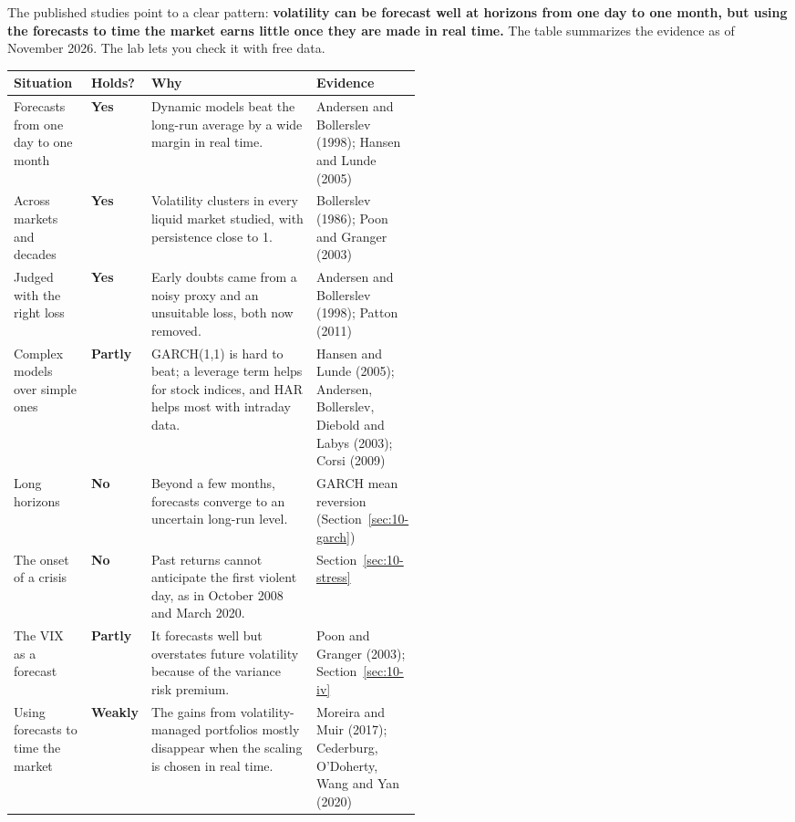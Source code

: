 The published studies point to a clear pattern: \textbf{volatility can be forecast well at horizons from one day to one month, but using the forecasts to time the market earns little once they are made in real time.} The table summarizes the evidence as of November 2026. The lab lets you check it with free data.

\begin{center}
\small
\begin{tabularx}{\linewidth}{@{}>{\raggedright\arraybackslash}p{0.19\linewidth}>{\raggedright\arraybackslash}p{0.10\linewidth}>{\raggedright\arraybackslash}X>{\raggedright\arraybackslash}p{0.23\linewidth}@{}}
\toprule
Situation & Holds? & Why & Evidence \\
\midrule
Forecasts from one day to one month & \textbf{Yes} & Dynamic models beat the long-run average by a wide margin in real time. & Andersen and Bollerslev (1998); Hansen and Lunde (2005) \\
\addlinespace[3pt]
Across markets and decades & \textbf{Yes} & Volatility clusters in every liquid market studied, with persistence close to 1. & Bollerslev (1986); Poon and Granger (2003) \\
\addlinespace[3pt]
Judged with the right loss & \textbf{Yes} & Early doubts came from a noisy proxy and an unsuitable loss, both now removed. & Andersen and Bollerslev (1998); Patton (2011) \\
\addlinespace[3pt]
Complex models over simple ones & \textbf{Partly} & GARCH(1,1) is hard to beat; a leverage term helps for stock indices, and HAR helps most with intraday data. & Hansen and Lunde (2005); Andersen, Bollerslev, Diebold and Labys (2003); Corsi (2009) \\
\addlinespace[3pt]
Long horizons & \textbf{No} & Beyond a few months, forecasts converge to an uncertain long-run level. & GARCH mean reversion (Section~\ref{sec:10-garch}) \\
\addlinespace[3pt]
The onset of a crisis & \textbf{No} & Past returns cannot anticipate the first violent day, as in October 2008 and March 2020. & Section~\ref{sec:10-stress} \\
\addlinespace[3pt]
The VIX as a forecast & \textbf{Partly} & It forecasts well but overstates future volatility because of the variance risk premium. & Poon and Granger (2003); Section~\ref{sec:10-iv} \\
\addlinespace[3pt]
Using forecasts to time the market & \textbf{Weakly} & The gains from volatility-managed portfolios mostly disappear when the scaling is chosen in real time. & Moreira and Muir (2017); Cederburg, O'Doherty, Wang and Yan (2020) \\
\bottomrule
\end{tabularx}
\end{center}

